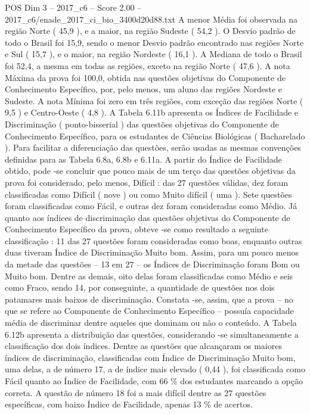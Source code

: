 \begin{textsample}{POS Dim 3 – 2017\_c6 – Score 2.00 – 2017\_c6/enade\_2017\_ci\_bio\_3400d20d88.txt}
A menor Média foi observada na região Norte ( 45,9 ), e a maior, na região Sudeste ( 54,2 ).
O Desvio padrão de todo o Brasil foi 15,9, sendo o menor Desvio padrão encontrado nas regiões Norte e Sul ( 15,7 ), e o maior, na região Nordeste ( 16,1 ).
A Mediana de todo o Brasil foi 52,4, a mesma em todas as regiões, exceto na região Norte ( 47,6 ).
A nota Máxima da prova foi 100,0, obtida nas questões objetivas do Componente de Conhecimento Específico, por, pelo menos, um aluno das regiões Nordeste e Sudeste.
A nota Mínima foi zero em três regiões, com exceção das regiões Norte ( 9,5 ) e Centro-Oeste ( 4,8 ).
A Tabela 6.11b apresenta os Índices de Facilidade e Discriminação ( ponto-bisserial ) das questões objetivas do Componente de Conhecimento Específico, para os estudantes de Ciências Biológicas ( Bacharelado ).
Para facilitar a diferenciação das questões, serão usadas as mesmas convenções definidas para as Tabela 6.8a, 6.8b e 6.11a.
A partir do Índice de Facilidade obtido, pode -se concluir que pouco mais de um terço das questões objetivas da prova foi considerado, pelo menos, Difícil : das 27 questões válidas, dez foram classificadas como Difícil ( nove ) ou como Muito difícil ( uma ).
Sete questões foram classificadas como Fácil, e outras dez foram consideradas como Médio.
Já quanto aos índices de discriminação das questões objetivas do Componente de Conhecimento Específico da prova, obteve -se como resultado a seguinte classificação : 11 das 27 questões foram consideradas como boas, enquanto outras duas tiveram Índice de Discriminação Muito bom.
Assim, para um pouco menos da metade das questões – 13 em 27 – os Índices de Discriminação foram Bom ou Muito bom.
Dentre as demais, oito delas foram classificadas como Médio e seis como Fraco, sendo 14, por conseguinte, a quantidade de questões nos dois patamares mais baixos de discriminação.
Constata -se, assim, que a prova – no que se refere ao Componente de Conhecimento Específico – possuía capacidade média de discriminar dentre aqueles que dominam ou não o conteúdo.
A Tabela 6.12b apresenta a distribuição das questões, considerando -se simultaneamente a classificação dos dois índices.
Dentre as questões que alcançaram os maiores índices de discriminação, classificadas com Índice de Discriminação Muito bom, uma delas, a de número 17, a de índice mais elevado ( 0,44 ), foi classificada como Fácil quanto ao Índice de Facilidade, com 66 \% dos estudantes marcando a opção correta.
A questão de número 18 foi a mais difícil dentre as 27 questões específicas, com baixo Índice de Facilidade, apenas 13 \% de acertos.

\end{textsample}
